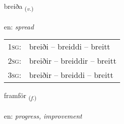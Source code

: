 \documentclass[frontgrid, backgrid]{flacards}\usepackage[]{graphicx}\usepackage[]{color}
\begin{document}
\renewcommand{\flhead}{\vskip5pt \fboxsep=0pt {\small\bfseries\footnotesize Sagnorð | Verb}}
\renewcommand{\fcfoot}{\vskip5pt \fboxsep=0pt \hspace{2pt}{\small\bfseries\footnotesize 2K}}

\renewcommand{\blhead}{\vskip5pt {\small\bfseries\footnotesize Sagnorð | Verb }}
\renewcommand{\bcfoot}{\vskip5pt \hspace{2pt}{\small\bfseries\footnotesize 2K}}


{breiða \small{\textsubscript{(\textit{v.})}} \\[1ex] %
\textphonetic{[preiːða]} \\
en: \emph{spread} \\  [2ex]
\renewcommand*{\arraystretch}{0.8}
\begin{tabular}{p{1cm}l}
\textsc{1sg}: & breiði -- breiddi -- breitt \\ 
\textsc{2sg}: & breiðir -- breiddir -- breitt \\ 
\textsc{3sg}: & breiðir -- breiddi -- breitt \\ 
\end{tabular}
}

\renewcommand{\flhead}{\vskip5pt \fboxsep=0pt {\small\bfseries\footnotesize Nafnorð | Noun}}
\renewcommand{\fcfoot}{\vskip5pt \fboxsep=0pt \hspace{2pt}{\small\bfseries\footnotesize 2K}}

\renewcommand{\blhead}{\vskip5pt {\small\bfseries\footnotesize Nafnorð | Noun }}
\renewcommand{\bcfoot}{\vskip5pt \hspace{2pt}{\small\bfseries\footnotesize 2K}}


{framför \small{\textsubscript{(\textit{f.})}} \\[1ex] %
\textphonetic{[framfœr]} \\
en: \emph{progress, improvement} \\  [2ex]
\renewcommand*{\arraystretch}{0.8}
}
\end{document}
